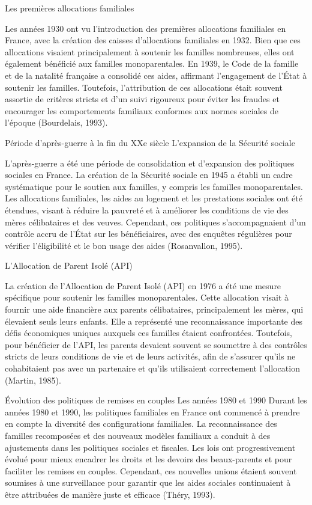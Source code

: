 \documentclass[
  12pt,
]{book}
\begin{document}
Les premières allocations familiales

Les années 1930 ont vu l'introduction des premières allocations
familiales en France, avec la création des caisses d'allocations
familiales en 1932. Bien que ces allocations visaient principalement à
soutenir les familles nombreuses, elles ont également bénéficié aux
familles monoparentales. En 1939, le Code de la famille et de la
natalité française a consolidé ces aides, affirmant l'engagement de
l'État à soutenir les familles. Toutefois, l'attribution de ces
allocations était souvent assortie de critères stricts et d'un suivi
rigoureux pour éviter les fraudes et encourager les comportements
familiaux conformes aux normes sociales de l'époque (Bourdelais, 1993).

Période d'après-guerre à la fin du XXe siècle L'expansion de la Sécurité
sociale

L'après-guerre a été une période de consolidation et d'expansion des
politiques sociales en France. La création de la Sécurité sociale en
1945 a établi un cadre systématique pour le soutien aux familles, y
compris les familles monoparentales. Les allocations familiales, les
aides au logement et les prestations sociales ont été étendues, visant à
réduire la pauvreté et à améliorer les conditions de vie des mères
célibataires et des veuves. Cependant, ces politiques s'accompagnaient
d'un contrôle accru de l'État sur les bénéficiaires, avec des enquêtes
régulières pour vérifier l'éligibilité et le bon usage des aides
(Rosanvallon, 1995).

L'Allocation de Parent Isolé (API)

La création de l'Allocation de Parent Isolé (API) en 1976 a été une
mesure spécifique pour soutenir les familles monoparentales. Cette
allocation visait à fournir une aide financière aux parents
célibataires, principalement les mères, qui élevaient seuls leurs
enfants. Elle a représenté une reconnaissance importante des défis
économiques uniques auxquels ces familles étaient confrontées.
Toutefois, pour bénéficier de l'API, les parents devaient souvent se
soumettre à des contrôles stricts de leurs conditions de vie et de leurs
activités, afin de s'assurer qu'ils ne cohabitaient pas avec un
partenaire et qu'ils utilisaient correctement l'allocation (Martin,
1985).

Évolution des politiques de remises en couples Les années 1980 et 1990
Durant les années 1980 et 1990, les politiques familiales en France ont
commencé à prendre en compte la diversité des configurations familiales.
La reconnaissance des familles recomposées et des nouveaux modèles
familiaux a conduit à des ajustements dans les politiques sociales et
fiscales. Les lois ont progressivement évolué pour mieux encadrer les
droits et les devoirs des beaux-parents et pour faciliter les remises en
couples. Cependant, ces nouvelles unions étaient souvent soumises à une
surveillance pour garantir que les aides sociales continuaient à être
attribuées de manière juste et efficace (Théry, 1993).
\end{document}
